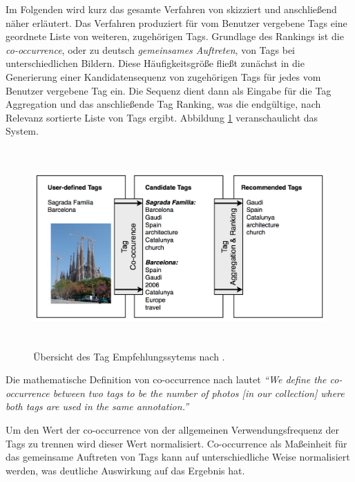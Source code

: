 Im Folgenden wird kurz das gesamte Verfahren von \cite{collectiveKnowledge} skizziert und anschließend näher erläutert. Das Verfahren produziert für vom Benutzer vergebene Tags eine geordnete Liste von weiteren, zugehörigen Tags. Grundlage des Rankings ist die \emph{co-occurrence}, oder zu deutsch \emph{gemeinsames Auftreten}, von Tags bei unterschiedlichen Bildern. Diese Häufigkeitsgröße fließt zunächst in die Generierung einer Kandidatensequenz von zugehörigen Tags für jedes vom Benutzer vergebene Tag ein. Die Sequenz dient dann als Eingabe für die Tag Aggregation und das anschließende Tag Ranking, was die endgültige, nach Relevanz sortierte Liste von Tags ergibt. Abbildung \ref{fig:images_collective_knowledge_system_overview} veranschaulicht das System.

\begin{figure}[htbp]
  \centering
    \includegraphics[height=3in]{images/collective_knowledge_system_overview.png}
  \caption{Übersicht des Tag Empfehlungssytems nach \cite{collectiveKnowledge}.}
  \label{fig:images_collective_knowledge_system_overview}
\end{figure}





Die mathematische Definition von co-occurrence nach \cite{collectiveKnowledge} lautet \emph{``We define the co-occurrence between two tags to be the number of photos [in our collection] where both tags are used in the same annotation.''} 
 
 
Um den Wert der co-occurrence von der allgemeinen Verwendungsfrequenz der Tags zu trennen wird dieser Wert normalisiert. Co-occurrence als Maßeinheit für das gemeinsame Auftreten von Tags kann auf unterschiedliche Weise normalisiert werden, was deutliche Auswirkung auf das Ergebnis hat.

